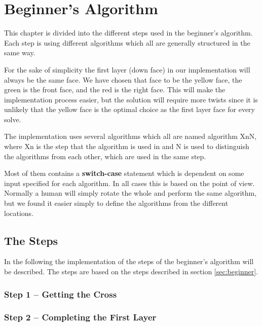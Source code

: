 \chapter{Beginner's Algorithm}\label{chap:beginnerImplement}
This chapter is divided into the different steps used in the beginner's algorithm.
Each step is using different algorithms which all are generally structured in the same way. 

For the sake of simplicity the first layer (down face) in our implementation will always be the same face. We have chosen that face to be the yellow face, the green is the front face, and the red is the right face. This will make the implementation process easier, but the solution will require more twists since it is unlikely that the yellow face is the optimal choice as the first layer face for every solve.

The implementation uses several algorithms which all are named algorithm XnN, where Xn is the step that the algorithm is used in and N is used to distinguish the algorithms from each other, which are used in the same step.

Most of them contains a \textbf{switch-case} statement which is dependent on some input specified for each algorithm. In all cases this is based on the point of view. Normally a human will simply rotate the whole \cube{} and perform the same algorithm, but we found it easier simply to define the algorithms from the different locations.

\section{The Steps}
In the following the implementation of the steps of the beginner's algorithm will be described.
The steps are based on the steps described in section \ref{sec:beginner}. 
\subsection{Step 1 -- Getting the Cross}

\subsection{Step 2 -- Completing the First Layer}

